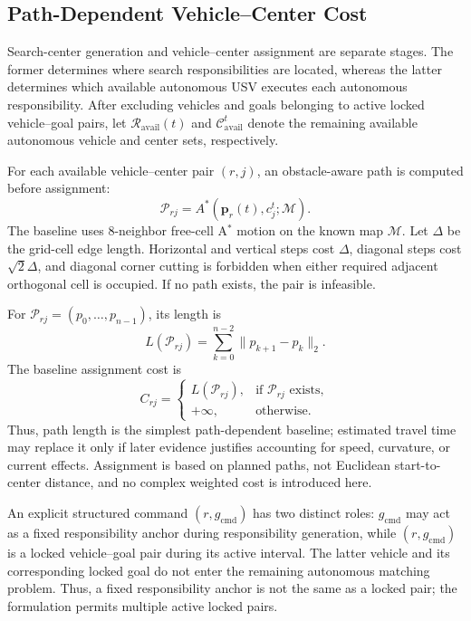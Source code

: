 \documentclass[letterpaper, 10pt, conference]{ieeeconf}
\begin{document}
\subsection{Path-Dependent Vehicle--Center Cost}

Search-center generation and vehicle--center assignment are separate stages. The former determines where search responsibilities are located, whereas the latter determines which available autonomous USV executes each autonomous responsibility. After excluding vehicles and goals belonging to active locked vehicle--goal pairs, let \(\mathcal{R}_{\mathrm{avail}}(t)\) and \(\mathcal{C}_{\mathrm{avail}}^t\) denote the remaining available autonomous vehicle and center sets, respectively.

For each available vehicle--center pair \((r,j)\), an obstacle-aware path is computed before assignment:
\begin{equation}
  \mathcal{P}_{rj} = A^\ast\!\left(\mathbf{p}_r(t),c_j^t;\mathcal{M}\right).
  \label{eq:vehicle_center_path}
\end{equation}
The baseline uses 8-neighbor free-cell A\(^\ast\) motion on the known map \(\mathcal{M}\). Let \(\Delta\) be the grid-cell edge length. Horizontal and vertical steps cost \(\Delta\), diagonal steps cost \(\sqrt{2}\Delta\), and diagonal corner cutting is forbidden when either required adjacent orthogonal cell is occupied. If no path exists, the pair is infeasible.

For \(\mathcal{P}_{rj}=(p_0,\ldots,p_{n-1})\), its length is
\begin{equation}
  L(\mathcal{P}_{rj}) =
  \sum_{k=0}^{n-2}\lVert p_{k+1}-p_k\rVert_2.
  \label{eq:path_length}
\end{equation}
The baseline assignment cost is
\begin{equation}
  C_{rj} =
  \begin{cases}
    L(\mathcal{P}_{rj}), & \text{if } \mathcal{P}_{rj} \text{ exists}, \\
    +\infty, & \text{otherwise}.
  \end{cases}
  \label{eq:path_dependent_cost}
\end{equation}
Thus, path length is the simplest path-dependent baseline; estimated travel time may replace it only if later evidence justifies accounting for speed, curvature, or current effects. Assignment is based on planned paths, not Euclidean start-to-center distance, and no complex weighted cost is introduced here.

An explicit structured command \((r,g_{\mathrm{cmd}})\) has two distinct roles: \(g_{\mathrm{cmd}}\) may act as a fixed responsibility anchor during responsibility generation, while \((r,g_{\mathrm{cmd}})\) is a locked vehicle--goal pair during its active interval. The latter vehicle and its corresponding locked goal do not enter the remaining autonomous matching problem. Thus, a fixed responsibility anchor is not the same as a locked pair; the formulation permits multiple active locked pairs.
\end{document}
